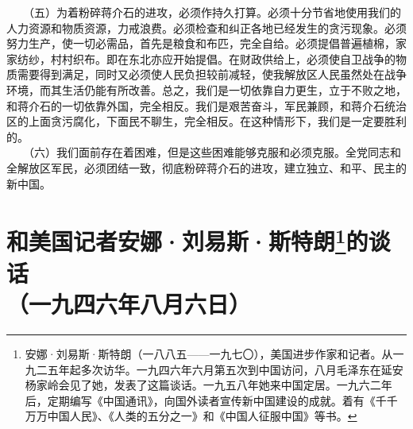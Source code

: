 \documentclass[cn,11pt,chinese]{elegantbook}
\def\myformat#1{\hfil\hfil #1}
\begin{document}
　　（五）为着粉碎蒋介石的进攻，必须作持久打算。必须十分节省地使用我们的人力资源和物质资源，力戒浪费。必须检查和纠正各地已经发生的贪污现象。必须努力生产，使一切必需品，首先是粮食和布匹，完全自给。必须提倡普遍植棉，家家纺纱，村村织布。即在东北亦应开始提倡。在财政供给上，必须使自卫战争的物质需要得到满足，同时又必须使人民负担较前减轻，使我解放区人民虽然处在战争环境，而其生活仍能有所改善。总之，我们是一切依靠自力更生，立于不败之地，和蒋介石的一切依靠外国，完全相反。我们是艰苦奋斗，军民兼顾，和蒋介石统治区的上面贪污腐化，下面民不聊生，完全相反。在这种情形下，我们是一定要胜利的。\\
　　（六）我们面前存在着困难，但是这些困难能够克服和必须克服。全党同志和全解放区军民，必须团结一致，彻底粉碎蒋介石的进攻，建立独立、和平、民主的新中国。\\
\newpage\section*{\myformat{和美国记者安娜·刘易斯·斯特朗\footnote[1]{ 安娜·刘易斯·斯特朗（一八八五——一九七〇），美国进步作家和记者。从一九二五年起多次访华。一九四六年六月第五次到中国访问，八月毛泽东在延安杨家岭会见了她，发表了这篇谈话。一九五八年她来中国定居。一九六二年后，定期编写《中国通讯》，向国外读者宣传新中国建设的成就。着有《千千万万中国人民》、《人类的五分之一》和《中国人征服中国》等书。}的谈话}\\\myformat{（一九四六年八月六日）}}
\end{document}
